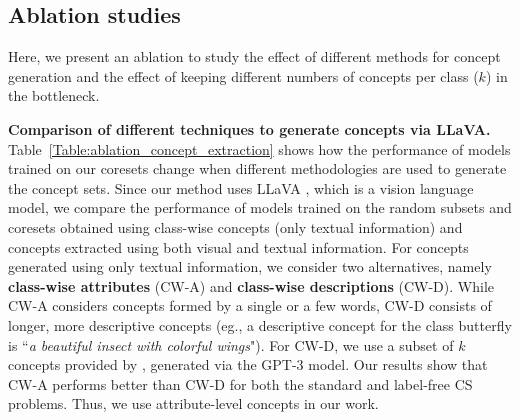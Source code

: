 
\subsection{Ablation studies}
\label{sec:ablation}
Here, we present an ablation to study the effect of different methods for concept generation and the effect of keeping different numbers of concepts per class ($k$) in the bottleneck.  



{\bf Comparison of different techniques to generate concepts via LLaVA.}
Table~\ref{Table:ablation_concept_extraction} shows how the performance of models trained on our coresets change when different methodologies are used to generate the concept sets. 
Since our method uses LLaVA \cite{liu2023llava}, which is a vision language model, we compare the performance of models trained on the random subsets and coresets obtained using class-wise concepts (only textual information) and concepts extracted using both visual and textual information. 
For concepts generated using only textual information, we consider two alternatives, namely {\bf class-wise attributes} (CW-A) and {\bf class-wise descriptions} (CW-D). 
While CW-A considers concepts formed by a single or a few words, CW-D consists of longer, more descriptive concepts (eg., a descriptive concept for the class butterfly is ``\emph{a beautiful insect with colorful wings}").
For CW-D, we use a subset of $k$ concepts provided by \cite{yang2023language}, generated via the GPT-3 model. 
Our results show that CW-A performs better than CW-D for both the standard and label-free CS problems. 
Thus, we use attribute-level concepts in our work.


